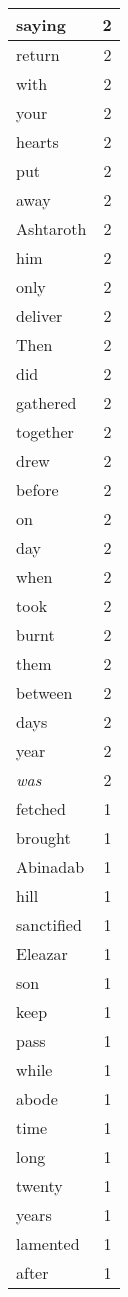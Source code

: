 \begin{center}
\begin{longtable}{l|r}
saying & 2 \\ \hline
return & 2 \\ \hline
with & 2 \\ \hline
your & 2 \\ \hline
hearts & 2 \\ \hline
put & 2 \\ \hline
away & 2 \\ \hline
Ashtaroth & 2 \\ \hline
him & 2 \\ \hline
only & 2 \\ \hline
deliver & 2 \\ \hline
Then & 2 \\ \hline
did & 2 \\ \hline
gathered & 2 \\ \hline
together & 2 \\ \hline
drew & 2 \\ \hline
before & 2 \\ \hline
on & 2 \\ \hline
day & 2 \\ \hline
when & 2 \\ \hline
took & 2 \\ \hline
burnt & 2 \\ \hline
them & 2 \\ \hline
between & 2 \\ \hline
days & 2 \\ \hline
year & 2 \\ \hline
\emph{was} & 2 \\ \hline
fetched & 1 \\ \hline
brought & 1 \\ \hline
Abinadab & 1 \\ \hline
hill & 1 \\ \hline
sanctified & 1 \\ \hline
Eleazar & 1 \\ \hline
son & 1 \\ \hline
keep & 1 \\ \hline
pass & 1 \\ \hline
while & 1 \\ \hline
abode & 1 \\ \hline
time & 1 \\ \hline
long & 1 \\ \hline
twenty & 1 \\ \hline
years & 1 \\ \hline
lamented & 1 \\ \hline
after & 1 \\ \hline

\end{longtable}
\end{center}
